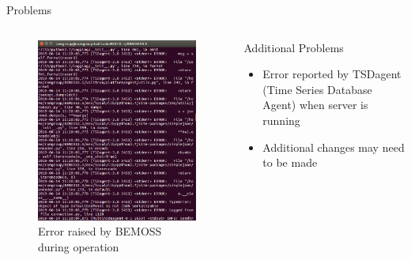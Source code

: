 \documentclass{beamer}
\begin{document}
\begin{frame}{Problems}
	\begin{columns}[T]
		\begin{column}{0.5\textwidth}
			\begin{figure}
				\includegraphics[scale=0.2]{../figs/screenshot61419.png}
				\caption{Error raised by BEMOSS during operation}
			\end{figure}
		\end{column}
		\begin{column}{0.5\textwidth}
			\begin{block}{Additional Problems}
				\begin{itemize}
					\item Error reported by TSDagent (Time Series Database Agent) when server is running
					\item Additional changes may need to be made
				\end{itemize}
			\end{block}
		\end{column}
	\end{columns}
\end{frame}
\end{document}
